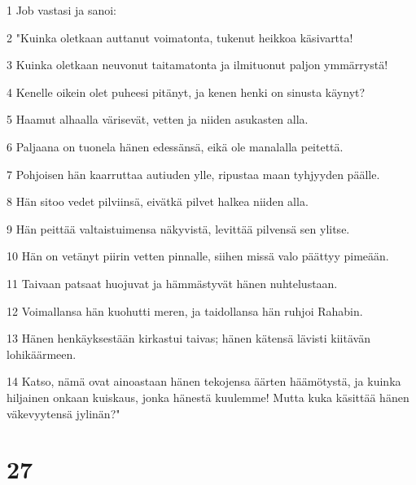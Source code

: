 \par 1 Job vastasi ja sanoi:
\par 2 "Kuinka oletkaan auttanut voimatonta, tukenut heikkoa käsivartta!
\par 3 Kuinka oletkaan neuvonut taitamatonta ja ilmituonut paljon ymmärrystä!
\par 4 Kenelle oikein olet puheesi pitänyt, ja kenen henki on sinusta käynyt?
\par 5 Haamut alhaalla värisevät, vetten ja niiden asukasten alla.
\par 6 Paljaana on tuonela hänen edessänsä, eikä ole manalalla peitettä.
\par 7 Pohjoisen hän kaarruttaa autiuden ylle, ripustaa maan tyhjyyden päälle.
\par 8 Hän sitoo vedet pilviinsä, eivätkä pilvet halkea niiden alla.
\par 9 Hän peittää valtaistuimensa näkyvistä, levittää pilvensä sen ylitse.
\par 10 Hän on vetänyt piirin vetten pinnalle, siihen missä valo päättyy pimeään.
\par 11 Taivaan patsaat huojuvat ja hämmästyvät hänen nuhtelustaan.
\par 12 Voimallansa hän kuohutti meren, ja taidollansa hän ruhjoi Rahabin.
\par 13 Hänen henkäyksestään kirkastui taivas; hänen kätensä lävisti kiitävän lohikäärmeen.
\par 14 Katso, nämä ovat ainoastaan hänen tekojensa äärten häämötystä, ja kuinka hiljainen onkaan kuiskaus, jonka hänestä kuulemme! Mutta kuka käsittää hänen väkevyytensä jylinän?"

\chapter{27}

